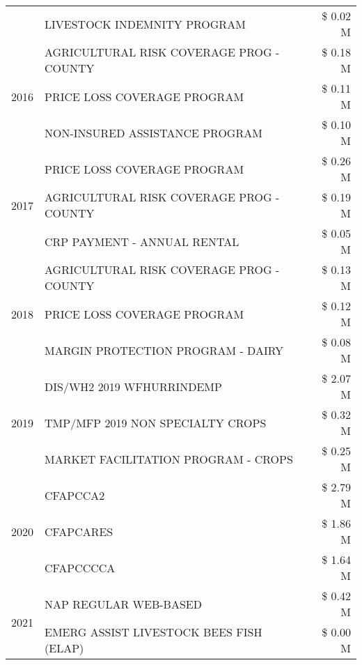 \begin{tabular}{llr}
 & LIVESTOCK INDEMNITY PROGRAM & \$ 0.02 M \\
\cline{1-3}
\multirow[t]{3}{*}{2016} & AGRICULTURAL RISK COVERAGE PROG - COUNTY & \$ 0.18 M \\
 & PRICE LOSS COVERAGE PROGRAM & \$ 0.11 M \\
 & NON-INSURED ASSISTANCE PROGRAM & \$ 0.10 M \\
\cline{1-3}
\multirow[t]{3}{*}{2017} & PRICE LOSS COVERAGE PROGRAM & \$ 0.26 M \\
 & AGRICULTURAL RISK COVERAGE PROG - COUNTY & \$ 0.19 M \\
 & CRP PAYMENT - ANNUAL RENTAL & \$ 0.05 M \\
\cline{1-3}
\multirow[t]{3}{*}{2018} & AGRICULTURAL RISK COVERAGE PROG - COUNTY & \$ 0.13 M \\
 & PRICE LOSS COVERAGE PROGRAM & \$ 0.12 M \\
 & MARGIN PROTECTION PROGRAM - DAIRY & \$ 0.08 M \\
\cline{1-3}
\multirow[t]{3}{*}{2019} & DIS/WH2 2019 WFHURRINDEMP & \$ 2.07 M \\
 & TMP/MFP 2019 NON SPECIALTY CROPS & \$ 0.32 M \\
 & MARKET FACILITATION PROGRAM - CROPS & \$ 0.25 M \\
\cline{1-3}
\multirow[t]{3}{*}{2020} & CFAPCCA2 & \$ 2.79 M \\
 & CFAPCARES & \$ 1.86 M \\
 & CFAPCCCCA & \$ 1.64 M \\
\cline{1-3}
\multirow[t]{2}{*}{2021} & NAP REGULAR WEB-BASED & \$ 0.42 M \\
 & EMERG ASSIST LIVESTOCK BEES FISH (ELAP) & \$ 0.00 M \\
\cline{1-3}
\bottomrule
\end{tabular}
